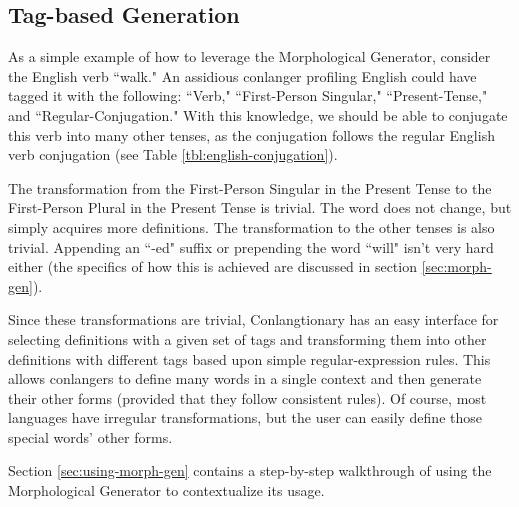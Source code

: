\subsection{Tag-based Generation}
\label{subsec:tag-based-generation}

As a simple example of how to leverage the Morphological Generator, consider the English verb ``walk." An assidious conlanger profiling English could have tagged it with the following: ``Verb," ``First-Person Singular," ``Present-Tense," and ``Regular-Conjugation." With this knowledge, we should be able to conjugate this verb into many other tenses, as the conjugation follows the regular English verb conjugation (see Table \ref{tbl:english-conjugation}).

The transformation from the First-Person Singular in the Present Tense to the First-Person Plural in the Present Tense is trivial. The word does not change, but simply acquires more definitions. The transformation to the other tenses is also trivial. Appending an ``-ed" suffix or prepending the word ``will" isn't very hard either (the specifics of how this is achieved are discussed in section \ref{sec:morph-gen}).

Since these transformations are trivial, Conlangtionary has an easy interface for selecting definitions with a given set of tags and transforming them into other definitions with different tags based upon simple regular-expression rules. This allows conlangers to define many words in a single context and then generate their other forms (provided that they follow consistent rules). Of course, most languages have irregular transformations, but the user can easily define those special words' other forms.

Section \ref{sec:using-morph-gen} contains a step-by-step walkthrough of using the Morphological Generator to contextualize its usage.

